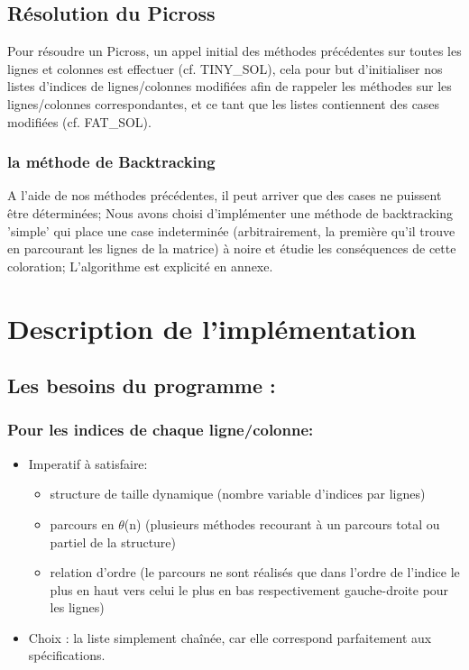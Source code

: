 \documentclass{article}
\begin{document}
\subsection{Résolution du Picross}
Pour résoudre un Picross, un appel initial des méthodes précédentes sur toutes les lignes et colonnes est effectuer (cf. TINY\_SOL), cela pour but d'initialiser nos listes d'indices de lignes/colonnes modifiées afin de rappeler les méthodes sur les lignes/colonnes correspondantes, et ce tant que les listes contiennent des cases modifiées (cf. FAT\_SOL).
\subsubsection{la méthode de Backtracking}
A l'aide de nos méthodes précédentes, il peut arriver que des cases ne puissent être déterminées;\newline
Nous avons choisi d'implémenter une méthode de backtracking 'simple' qui place une case indeterminée (arbitrairement, la première qu'il trouve en parcourant les lignes de la matrice) à noire et étudie les conséquences de cette coloration;
L'algorithme est explicité en annexe.
\newpage
\section{Description de l'implémentation}
\subsection{Les besoins du programme :}
\subsubsection{Pour les indices de chaque ligne/colonne:}
\begin{itemize}
\item Imperatif à satisfaire:
\begin{itemize}
\item structure de taille dynamique (nombre variable d'indices par lignes)
\item parcours en $\theta$(n) (plusieurs méthodes recourant à un parcours total ou partiel de la structure)
\item relation d'ordre (le parcours ne sont réalisés que dans l'ordre de l'indice le plus en haut vers celui le plus en bas respectivement gauche-droite pour les lignes)
\end{itemize}
\item Choix : la liste simplement chaînée, car elle correspond parfaitement aux spécifications.
\end{itemize}
\end{document}
